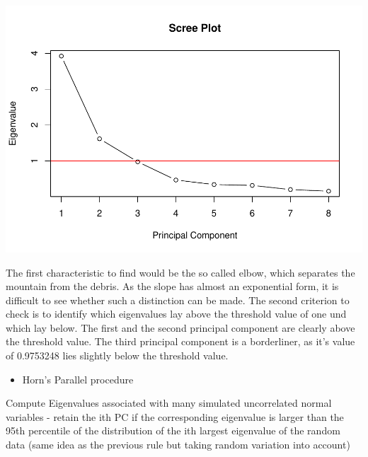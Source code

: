 \documentclass[]{article}
\providecommand{\tightlist}{%
  \setlength{\itemsep}{0pt}\setlength{\parskip}{0pt}}
\begin{document}
\includegraphics{assignment1_PCA_files/figure-latex/unnamed-chunk-6-1.pdf}

The first characteristic to find would be the so called elbow, which
separates the mountain from the debris. As the slope has almost an
exponential form, it is difficult to see whether such a distinction can
be made. The second criterion to check is to identify which eigenvalues
lay above the threshold value of one und which lay below. The first and
the second principal component are clearly above the threshold value.
The third principal component is a borderliner, as it's value of
0.9753248 lies slightly below the threshold value.

\begin{itemize}
\tightlist
\item
  Horn's Parallel procedure
\end{itemize}

Compute Eigenvalues associated with many simulated uncorrelated normal
variables - retain the ith PC if the corresponding eigenvalue is larger
than the 95th percentile of the distribution of the ith largest
eigenvalue of the random data (same idea as the previous rule but taking
random variation into account)
\end{document}
